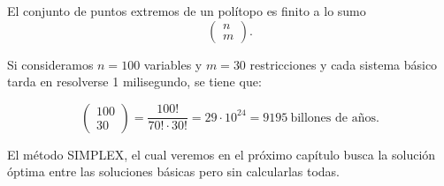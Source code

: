 \begin{corolario}
  El conjunto de puntos extremos de un polítopo es finito a lo sumo 	
  $$\left(
    \begin{array}{c}
      n\\
      m	
    \end{array}\right).$$
        
\end{corolario}

\begin{ejemplo}
  
  Si consideramos $n=100$ variables y $m=30$ restricciones y cada sistema básico tarda en resolverse 1 milisegundo, se tiene que:
  
  $$\left(
    \begin{array}{c}
      100 \\
      30
    \end{array}\right) = \frac{100!}{70! \cdot 30!} = 29 \cdot 10^{24} = 9195 \ \text{billones de años.}$$
              
\end{ejemplo}

El método SIMPLEX, el cual veremos en el próximo capítulo busca la solución óptima entre las soluciones básicas pero sin calcularlas todas.
